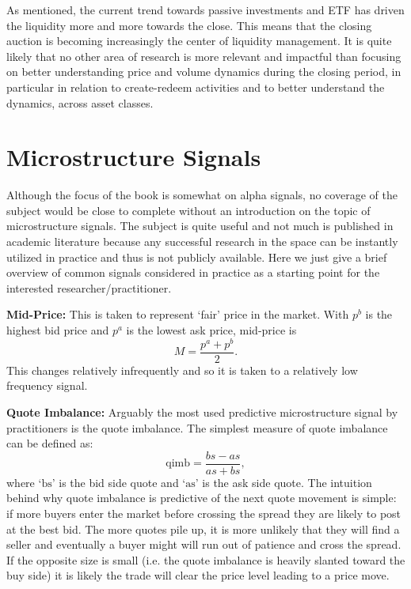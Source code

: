 As mentioned, the current trend towards passive investments and ETF has driven the liquidity more and more towards the close. This means that the closing auction is becoming increasingly the center of liquidity management.  It is quite likely that no other area of research is more relevant and impactful than focusing on better understanding price and volume dynamics during the closing period, in particular in relation to create-redeem activities and to better understand the dynamics, across asset classes.



\section{Microstructure Signals }

Although the focus of the book is somewhat on alpha signals, no coverage of the subject would be close to complete without an introduction on the topic of microstructure signals. The subject is quite useful and not much is published in academic literature because any successful research in the space can be instantly utilized in practice and thus is not publicly available. Here we just give a brief overview of common signals considered in practice as a starting point for the interested researcher/practitioner. \twomedskip


\noindent\textbf{Mid-Price:} This is taken to represent `fair' price in the market. With $p^b$ is the highest bid price and $p^a$ is the lowest ask price, mid-price is
	\begin{equation} \label{eqn:mpapbover2}
	M= \dfrac{p^a + p^b}{2}.
	\end{equation}
This changes relatively infrequently and so it is taken to a relatively low frequency signal. \twomedskip


\noindent\textbf{Quote Imbalance:} Arguably the most used predictive microstructure signal by practitioners is the quote imbalance.  The simplest measure of quote imbalance can be defined as: 
	\begin{equation} \label{eq:q_imb}
	\text{qimb} = \frac{bs - as}{as + bs},
	\end{equation}
where `$\text{bs}$' is the bid side quote and `$\text{as}$' is the ask side quote. The intuition behind why quote imbalance is predictive of the next quote movement is simple: if more buyers enter the market before crossing the spread they are likely to post at the best bid. The more quotes pile up, it is more unlikely that they will find a seller and eventually a buyer might will run out of patience and cross the spread. If the opposite size is small (i.e. the quote imbalance is heavily slanted toward the buy side) it is likely the trade will clear the price level leading to a price move. \twomedskip


